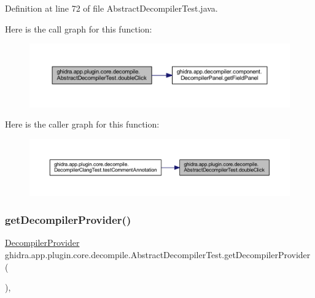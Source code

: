 Definition at line 72 of file Abstract\+Decompiler\+Test.\+java.

Here is the call graph for this function\+:
\nopagebreak
\begin{figure}[H]
\begin{center}
\leavevmode
\includegraphics[width=350pt]{classghidra_1_1app_1_1plugin_1_1core_1_1decompile_1_1_abstract_decompiler_test_a1063d5440b4632c1589366050d8395b5_cgraph}
\end{center}
\end{figure}
Here is the caller graph for this function\+:
\nopagebreak
\begin{figure}[H]
\begin{center}
\leavevmode
\includegraphics[width=350pt]{classghidra_1_1app_1_1plugin_1_1core_1_1decompile_1_1_abstract_decompiler_test_a1063d5440b4632c1589366050d8395b5_icgraph}
\end{center}
\end{figure}
\mbox{\label{classghidra_1_1app_1_1plugin_1_1core_1_1decompile_1_1_abstract_decompiler_test_a3500d6885e44afbd2c17791b7cbef0fe}} 
\subsubsection{\texorpdfstring{getDecompilerProvider()}{getDecompilerProvider()}}
{\footnotesize\ttfamily \mbox{\hyperlink{classghidra_1_1app_1_1plugin_1_1core_1_1decompile_1_1_decompiler_provider}{Decompiler\+Provider}} ghidra.\+app.\+plugin.\+core.\+decompile.\+Abstract\+Decompiler\+Test.\+get\+Decompiler\+Provider (\begin{DoxyParamCaption}{ }\end{DoxyParamCaption})\hspace{0.3cm}{\ttfamily [inline]}, {\ttfamily [protected]}}



